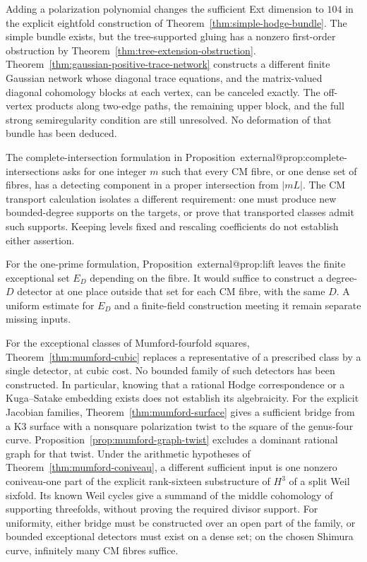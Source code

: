 \documentclass[11pt]{article}
\makeatletter
\providecommand{\compref}[1]{\csname external@#1\endcsname}
\theoremstyle{definition}
\theoremstyle{remark}
\makeatother
\begin{document}
Adding a polarization polynomial changes the sufficient Ext dimension
to $104$ in the explicit eightfold construction of
Theorem~\ref{thm:simple-hodge-bundle}.
The simple bundle exists, but the tree-supported gluing has a
nonzero first-order obstruction by
Theorem~\ref{thm:tree-extension-obstruction}.
Theorem~\ref{thm:gaussian-positive-trace-network} constructs a different
finite Gaussian network whose diagonal trace equations, and the
matrix-valued diagonal cohomology blocks at each vertex, can be
canceled exactly.  The off-vertex products along two-edge paths,
the remaining upper block, and the full strong semiregularity
condition are still unresolved.  No deformation of that bundle
has been deduced.

The complete-intersection formulation in Proposition~\compref{prop:complete-intersections} asks for one integer $m$ such that every CM fibre, or one dense set of fibres, has a detecting component in a proper intersection from $|mL|$. The CM transport calculation isolates a different requirement: one must produce new bounded-degree supports on the targets, or prove that transported classes admit such supports. Keeping levels fixed and rescaling coefficients do not establish either assertion.

For the one-prime formulation, Proposition~\compref{prop:lift} leaves the finite exceptional set $E_D$ depending on the fibre. It would suffice to construct a degree-$D$ detector at one place outside that set for each CM fibre, with the same $D$. A uniform estimate for $E_D$ and a finite-field construction meeting it remain separate missing inputs.


For the exceptional classes of Mumford-fourfold squares, Theorem~\ref{thm:mumford-cubic} replaces a representative of a prescribed class by a single detector, at cubic cost. No bounded family of such detectors has been constructed. In particular, knowing that a rational Hodge correspondence or a Kuga--Satake embedding exists does not establish its algebraicity. For the explicit Jacobian families, Theorem~\ref{thm:mumford-surface} gives a sufficient bridge from a K3 surface with a nonsquare polarization twist to the square of the genus-four curve. Proposition~\ref{prop:mumford-graph-twist} excludes a dominant rational graph for that twist. Under the arithmetic hypotheses of Theorem~\ref{thm:mumford-coniveau}, a different sufficient input is one nonzero coniveau-one part of the explicit rank-sixteen substructure of $H^3$ of a split Weil sixfold. Its known Weil cycles give a summand of the middle cohomology of supporting threefolds, without proving the required divisor support. For uniformity, either bridge must be constructed over an open part of the family, or bounded exceptional detectors must exist on a dense set; on the chosen Shimura curve, infinitely many CM fibres suffice.
\end{document}
